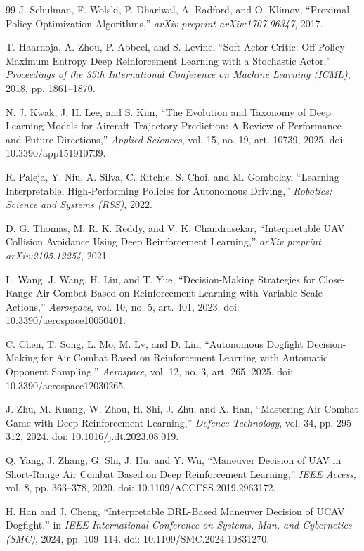 \documentclass[drones,article,submit,pdftex,moreauthors]{Definitions/mdpi}
\begin{document}
\begin{thebibliography}{99}
J. Schulman, F. Wolski, P. Dhariwal, A. Radford, and O. Klimov,
``Proximal Policy Optimization Algorithms,''
\emph{arXiv preprint arXiv:1707.06347}, 2017.

T. Haarnoja, A. Zhou, P. Abbeel, and S. Levine,
``Soft Actor-Critic: Off-Policy Maximum Entropy Deep Reinforcement Learning with a Stochastic Actor,''
\emph{Proceedings of the 35th International Conference on Machine Learning (ICML)}, 2018, pp. 1861--1870.

N. J. Kwak, J. H. Lee, and S. Kim,
``The Evolution and Taxonomy of Deep Learning Models for Aircraft Trajectory Prediction: A Review of Performance and Future Directions,''
\emph{Applied Sciences}, vol. 15, no. 19, art. 10739, 2025.
doi: 10.3390/app151910739.

R. Paleja, Y. Niu, A. Silva, C. Ritchie, S. Choi, and M. Gombolay,
``Learning Interpretable, High-Performing Policies for Autonomous Driving,''
\emph{Robotics: Science and Systems (RSS)}, 2022.

D. G. Thomas, M. R. K. Reddy, and V. K. Chandrasekar,
``Interpretable UAV Collision Avoidance Using Deep Reinforcement Learning,''
\emph{arXiv preprint arXiv:2105.12254}, 2021.

L. Wang, J. Wang, H. Liu, and T. Yue,
``Decision-Making Strategies for Close-Range Air Combat Based on Reinforcement Learning with Variable-Scale Actions,''
\emph{Aerospace}, vol. 10, no. 5, art. 401, 2023.
doi: 10.3390/aerospace10050401.

C. Chen, T. Song, L. Mo, M. Lv, and D. Lin,
``Autonomous Dogfight Decision-Making for Air Combat Based on Reinforcement Learning with Automatic Opponent Sampling,''
\emph{Aerospace}, vol. 12, no. 3, art. 265, 2025.
doi: 10.3390/aerospace12030265.

J. Zhu, M. Kuang, W. Zhou, H. Shi, J. Zhu, and X. Han,
``Mastering Air Combat Game with Deep Reinforcement Learning,''
\emph{Defence Technology}, vol. 34, pp. 295--312, 2024.
doi: 10.1016/j.dt.2023.08.019.

Q. Yang, J. Zhang, G. Shi, J. Hu, and Y. Wu,
``Maneuver Decision of UAV in Short-Range Air Combat Based on Deep Reinforcement Learning,''
\emph{IEEE Access}, vol. 8, pp. 363--378, 2020.
doi: 10.1109/ACCESS.2019.2963172.

H. Han and J. Cheng,
``Interpretable DRL-Based Maneuver Decision of UCAV Dogfight,''
in \emph{IEEE International Conference on Systems, Man, and Cybernetics (SMC)}, 2024, pp. 109--114.
doi: 10.1109/SMC.2024.10831270.


\end{thebibliography}
\end{document}
